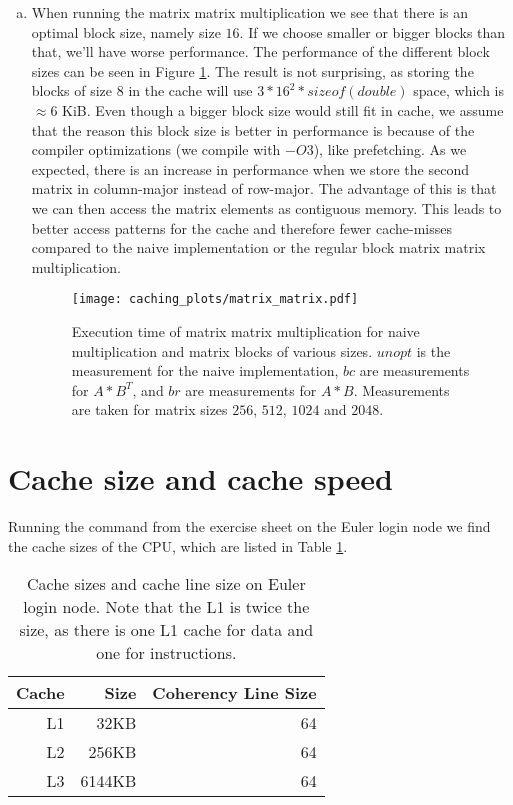\documentclass[a4paper,10pt]{article} %
\begin{document}
\begin{enumerate}[a)]
\item
When running the matrix matrix multiplication we see that there is an optimal block size, namely size $16$. If we choose smaller or bigger blocks than that, we'll have worse performance. The performance of the different block sizes can be seen in Figure \ref{fig:mat_mat_mul}. The result is not surprising, as storing the blocks of size $8$ in the cache will use $3*16^2 * sizeof(double)$ space, which is $\approx 6$ KiB. Even though a bigger block size would still fit in cache, we assume that the reason this block size is better in performance is because of the compiler optimizations (we compile with $-O3$), like prefetching. As we expected, there is an increase in performance when we store the second matrix in column-major instead of row-major. The advantage of this is that we can then access the matrix elements as contiguous memory. This leads to better access patterns for the cache and therefore fewer cache-misses compared to the naive implementation or the regular block matrix matrix multiplication.

\begin{figure}[]
  \centering
  \begin{minipage}[t]{0.8\textwidth}
    \texttt{[image: caching\_plots/matrix\_matrix.pdf]}
    \caption{Execution time of matrix matrix multiplication for naive multiplication and matrix blocks of various sizes. $unopt$ is the measurement for the naive implementation, $bc$ are measurements for $A*B^T$, and $br$ are measurements for $A*B$. Measurements are taken for matrix sizes $256$, $512$, $1024$ and $2048$.}
    \label{fig:mat_mat_mul}
  \end{minipage}
\end{figure}

\end{enumerate}
\newpage 
 
\section{Cache size and cache speed}

Running the command from the exercise sheet on the Euler login node we find the cache sizes of the CPU, which are listed in Table \ref{table:1}.
{\begin{table}[h!]
 \centering
{\begin{tabular}{r r r}
    \toprule
    Cache & Size & Coherency Line Size \\
    \midrule
    L1 & 32KB & 64 \\
    L2 & 256KB & 64 \\
    L3 & 6144KB & 64 \\
    \bottomrule
\end{tabular}}
{\caption{Cache sizes and cache line size on Euler login node. Note that the L1 is twice the size, as there is one L1 cache for data and one for instructions.}    
\label{table:1}}
\end{table}}
\end{document}
